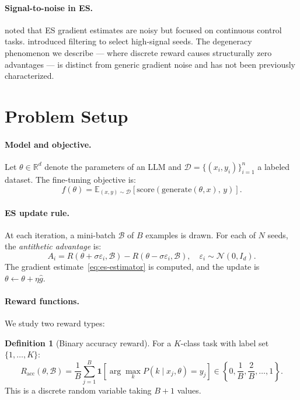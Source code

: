 \documentclass[11pt]{article}
\theoremstyle{definition}
\newtheorem{definition}{Definition}
\theoremstyle{remark}
\newcommand{\E}{\mathbb{E}}
\newcommand{\R}{\mathbb{R}}
\begin{document}
\paragraph{Signal-to-noise in ES.}
\citet{salimans2017openai} noted that ES gradient estimates are noisy but focused on continuous control tasks. \citet{mania2018ars} introduced filtering to select high-signal seeds. The degeneracy phenomenon we describe --- where discrete reward causes structurally zero advantages --- is distinct from generic gradient noise and has not been previously characterized.

\section{Problem Setup}
\label{sec:setup}

\paragraph{Model and objective.}
Let $\theta \in \R^d$ denote the parameters of an LLM and $\mathcal{D} = \{(x_i, y_i)\}_{i=1}^{n}$ a labeled dataset. The fine-tuning objective is:
\begin{equation}
  f(\theta) = \E_{(x,y) \sim \mathcal{D}}\left[\mathrm{score}(\mathrm{generate}(\theta, x),\, y)\right].
\end{equation}

\paragraph{ES update rule.}
At each iteration, a mini-batch $\mathcal{B}$ of $B$ examples is drawn. For each of $N$ seeds, the \emph{antithetic advantage} is:
\begin{equation}
  A_i = R(\theta + \sigma\varepsilon_i, \mathcal{B}) - R(\theta - \sigma\varepsilon_i, \mathcal{B}),
  \quad \varepsilon_i \sim \mathcal{N}(0, I_d).
  \label{eq:advantage}
\end{equation}
The gradient estimate~\eqref{eq:es-estimator} is computed, and the update is $\theta \leftarrow \theta + \eta \hat{g}$.

\paragraph{Reward functions.}
We study two reward types:

\begin{definition}[Binary accuracy reward]
For a $K$-class task with label set $\{1,\ldots,K\}$:
\begin{equation}
  R_{\mathrm{acc}}(\theta, \mathcal{B}) = \frac{1}{B}\sum_{j=1}^{B} \mathbf{1}\!\left[\arg\max_k P(k \mid x_j, \theta) = y_j\right] \in \left\{0, \frac{1}{B}, \frac{2}{B}, \ldots, 1\right\}.
  \label{eq:binary-reward}
\end{equation}
This is a discrete random variable taking $B+1$ values.
\end{definition}
\end{document}
